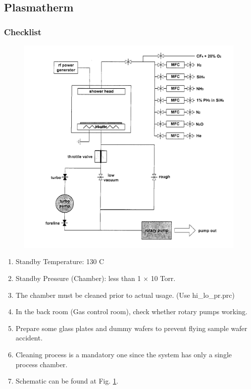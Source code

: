 \pagebreak
\subsection{Plasmatherm}
\subsubsection{Checklist}

\begin{figure}[htp]
\centering
\includegraphics[width=.8\textwidth]{./img/plasmatherm.png}
\label{fig:Plasmatherm}
\end{figure}

\begin{enumerate}
\item Standby Temperature: 130 C
\item Standby Pressure (Chamber): less than 1 $\times$ 10 Torr.
\item The chamber must be cleaned prior to actual usage. (Use hi\_lo\_pr.prc)
\item In the back room (Gas control room), check whether rotary pumps working.
\item Prepare some glass plates and dummy wafers to prevent flying sample wafer accident.
\item Cleaning process is a mandatory one since the system has only a single process chamber.
\item Schematic can be found at Fig. \ref{fig:Plasmatherm}.
\end{enumerate}

